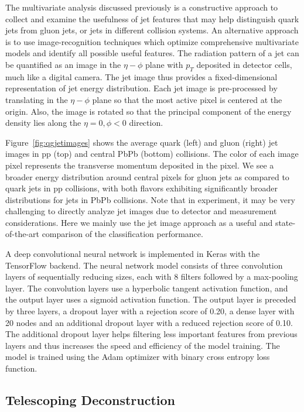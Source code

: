 \documentclass[notoc,preprintnumbers]{JHEP3}
\begin{document}
The multivariate analysis discussed previously is a constructive approach to collect and examine the usefulness of jet features that may help distinguish quark jets from gluon jets, or jets in different collision systems. An alternative approach is to use image-recognition techniques which optimize comprehensive multivariate models and identify all possible useful features. The radiation pattern of a jet can be quantified as an image in the $\eta-\phi$ plane with $p_T$ deposited in detector cells, much like a digital camera. The jet image thus provides a fixed-dimensional representation of jet energy distribution. Each jet image is pre-processed \cite{deOliveira:2015xxd} by translating in the $\eta-\phi$ plane so that the most active pixel is centered at the origin. Also, the image is rotated so that the principal component of the energy density lies along the $\eta=0, \phi<0$ direction.

Figure~\ref{fig:qgjetimages} shows the average quark (left) and gluon (right) jet images in pp (top) and central PbPb (bottom) collisions. The color of each image pixel represents the transverse momentum deposited in the pixel. We see a broader energy distribution around central pixels for gluon jets as compared to quark jets in pp collisions, with both flavors exhibiting significantly broader distributions for jets in PbPb collisions. Note that in experiment, it may be very challenging to directly analyze jet images due to detector and measurement considerations. Here we mainly use the jet image approach as a useful and state-of-the-art comparison of the classification performance.
	
A deep convolutional neural network is implemented in Keras with the TensorFlow \cite{DBLP:journals/corr/AbadiBCCDDDGIIK16} backend. The neural network model consists of three convolution layers of sequentially reducing sizes, each with 8 filters followed by a max-pooling layer. The convolution layers use a hyperbolic tangent activation function, and the output layer uses a sigmoid activation function. The output layer is preceded by three layers, a dropout layer with a rejection score of 0.20, a dense layer with 20 nodes and an additional dropout layer with a reduced rejection score of 0.10. The additional dropout layer helps filtering less important features from previous layers and thus increases the speed and efficiency of the model training. The model is trained using the Adam optimizer with binary cross entropy loss function.

\subsection{Telescoping Deconstruction}
\label{sec:tjet}
\end{document}
